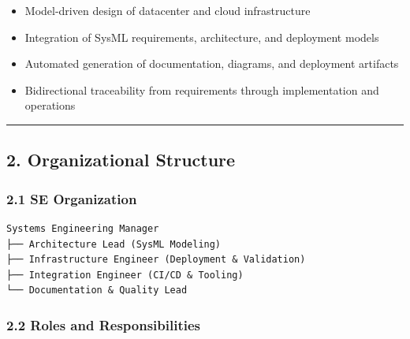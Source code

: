 \documentclass[12pt]{article}
\providecommand{\tightlist}{%
  \setlength{\itemsep}{0pt}\setlength{\parskip}{0pt}}
\begin{document}
\begin{itemize}
\tightlist
\item
  Model-driven design of datacenter and cloud infrastructure
\item
  Integration of SysML requirements, architecture, and deployment models
\item
  Automated generation of documentation, diagrams, and deployment
  artifacts
\item
  Bidirectional traceability from requirements through implementation
  and operations
\end{itemize}

\begin{center}\rule{0.5\linewidth}{0.5pt}\end{center}

\subsection{2. Organizational Structure}\label{organizational-structure}

\subsubsection{2.1 SE Organization}\label{se-organization}

\begin{verbatim}
Systems Engineering Manager
├── Architecture Lead (SysML Modeling)
├── Infrastructure Engineer (Deployment & Validation)
├── Integration Engineer (CI/CD & Tooling)
└── Documentation & Quality Lead
\end{verbatim}

\subsubsection{2.2 Roles and
Responsibilities}\label{roles-and-responsibilities}
\end{document}
